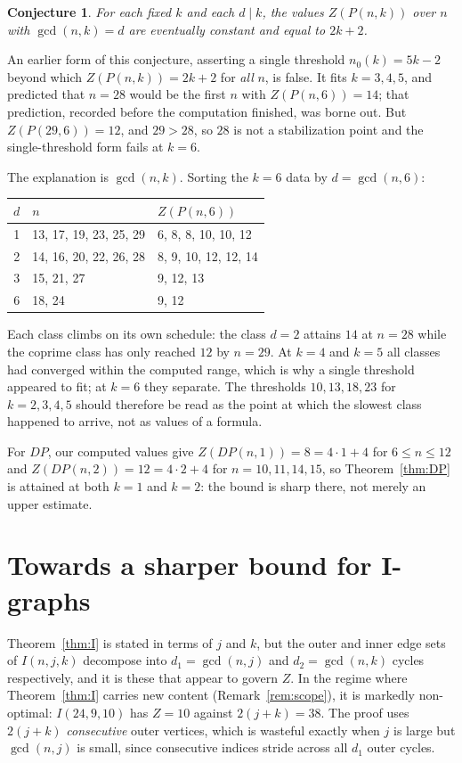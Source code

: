 \documentclass[11pt]{article}
\newtheorem{conjecture}[theorem]{Conjecture}
\theoremstyle{definition}
\begin{document}
\begin{conjecture}\label{conj}
For each fixed $k$ and each $d\mid k$, the values $Z(P(n,k))$ over $n$ with
$\gcd(n,k)=d$ are eventually constant and equal to $2k+2$.
\end{conjecture}

\noindent
An earlier form of this conjecture, asserting a single threshold
$n_0(k)=5k-2$ beyond which $Z(P(n,k))=2k+2$ for \emph{all} $n$, is false. It
fits $k=3,4,5$, and predicted that $n=28$ would be the first $n$ with
$Z(P(n,6))=14$; that prediction, recorded before the computation finished, was
borne out. But $Z(P(29,6))=12$, and $29>28$, so $28$ is not a stabilization
point and the single-threshold form fails at $k=6$.

The explanation is $\gcd(n,k)$. Sorting the $k=6$ data by $d=\gcd(n,6)$:

\begin{center}
\begin{tabular}{cll}
\toprule
$d$ & $n$ & $Z(P(n,6))$ \\
\midrule
1 & 13, 17, 19, 23, 25, 29 & 6, 8, 8, 10, 10, 12 \\
2 & 14, 16, 20, 22, 26, 28 & 8, 9, 10, 12, 12, 14 \\
3 & 15, 21, 27 & 9, 12, 13 \\
6 & 18, 24 & 9, 12 \\
\bottomrule
\end{tabular}
\end{center}

\noindent
Each class climbs on its own schedule: the class $d=2$ attains $14$ at $n=28$
while the coprime class has only reached $12$ by $n=29$. At $k=4$ and $k=5$ all
classes had converged within the computed range, which is why a single
threshold appeared to fit; at $k=6$ they separate. The thresholds $10,13,18,23$
for $k=2,3,4,5$ should therefore be read as the point at which the slowest
class happened to arrive, not as values of a formula.

For $DP$, our computed values give $Z(DP(n,1))=8=4\cdot1+4$ for $6\le n\le12$
and $Z(DP(n,2))=12=4\cdot2+4$ for $n=10,11,14,15$, so Theorem~\ref{thm:DP} is
attained at both $k=1$ and $k=2$: the bound is sharp there, not merely an
upper estimate.

\section{Towards a sharper bound for I-graphs}
Theorem~\ref{thm:I} is stated in terms of $j$ and $k$, but the outer and inner
edge sets of $I(n,j,k)$ decompose into $d_1=\gcd(n,j)$ and $d_2=\gcd(n,k)$
cycles respectively, and it is these that appear to govern $Z$. In the regime where Theorem~\ref{thm:I} carries new content
(Remark~\ref{rem:scope}), it is markedly non-optimal: $I(24,9,10)$ has $Z=10$
against $2(j+k)=38$. The proof uses $2(j+k)$ \emph{consecutive} outer vertices,
which is wasteful exactly when $j$ is large but $\gcd(n,j)$ is small, since
consecutive indices stride across all $d_1$ outer cycles.
\end{document}
